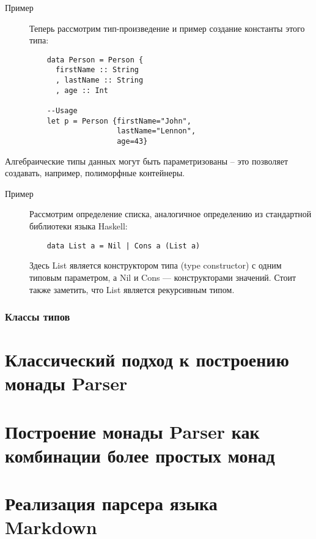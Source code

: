 \begin{description}
  \item[Пример] 
  Теперь рассмотрим тип-произведение и пример создание константы этого типа: 
  \begin{lstlisting}
    data Person = Person {
      firstName :: String
      , lastName :: String
      , age :: Int

    --Usage
    let p = Person {firstName="John", 
                    lastName="Lennon", 
                    age=43}
  \end{lstlisting}
\end{description}

Алгебраические типы данных могут быть параметризованы -- это позволяет создавать, например, полиморфные контейнеры.

\begin{description}
  \item[Пример] 
  Рассмотрим определение списка, аналогичное определению из стандартной библиотеки языка Haskell:
  \begin{lstlisting}
    data List a = Nil | Cons a (List a)
  \end{lstlisting}
  Здесь List является конструктором типа (type constructor) с одним типовым параметром, а Nil и Cons --- конструкторами значений. Стоит также заметить, что List является рекурсивным типом.
\end{description}

\subsection{Классы типов}



\chapter{Классический подход к построению монады Parser}

\chapter{Построение монады Parser как комбинации более простых монад}

\chapter{Реализация парсера языка Markdown} 

\printbibliography[heading=bibintoc%
]


